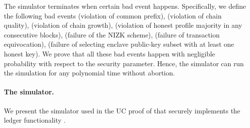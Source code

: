 The simulator terminates when certain bad event happens.
%
Specifically, we define the following bad events \badCP (violation of common prefix), \badCQ (violation of chain quality), \badCG (violation of chain growth), \badProfile (violation of honest profile majority in any \PBWindowLen consecutive blocks), \badNIZK (failure of the NIZK scheme), \badDec (failure of transaction equivocation), \badTicket (failure of selecting enclave public-key subset with at least one honest key).
%
We prove that all these bad events happen with negligible probability with respect to the security parameter.
%
Hence, the simulator can run the simulation for any polynomial time without abortion.

\paragraph{The simulator.}
%
We present the simulator used in the UC proof of \protocFairLedger that securely implements the ledger functionality \funcFairLedger.







